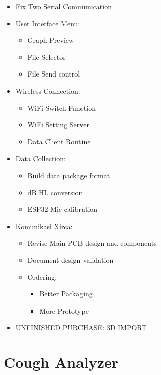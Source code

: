 \documentclass{article} %
\begin{document}
\begin{itemize}
    \item Fix Two Serial Communication

    \item User Interface Menu:
     \begin{itemize}
         \item Graph Preview
         \item File Selector
         \item File Send control
     \end{itemize}

    \item Wireless Connection:
    \begin{itemize}
        \item WiFi Switch Function
        \item WiFi Setting Server
        \item Data Client Routine
    \end{itemize}

    \item Data Collection:
    \begin{itemize}
        \item Build data package format
        \item dB HL conversion
        \item ESP32 Mic calibration
    \end{itemize}

    \item Komunikasi Xirca:
    \begin{itemize}
        \item Revise Main PCB design and components
        \item Document design validation
        \item Ordering:
        \begin{itemize}
            \item Better Packaging
            \item More Prototype
        \end{itemize}
    \end{itemize}

    \item UNFINISHED PURCHASE: 3D IMPORT
\end{itemize}

\newpage

\section{Cough Analyzer}
\end{document}
